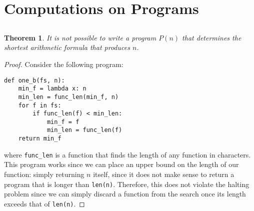 \documentclass{article}
\newtheorem{theorem}{Theorem}
\begin{document}
\section{Computations on Programs}

\subsection{}

\begin{theorem}
    It is not possible to write a program \(P(n)\) that determines the shortest arithmetic formula that produces \(n\).
\end{theorem}
\begin{proof}
    Consider the following program:
    \begin{lstlisting}
def one_b(fs, n):
    min_f = lambda x: n
    min_len = func_len(min_f, n)
    for f in fs:
        if func_len(f) < min_len:
            min_f = f
            min_len = func_len(f)
    return min_f
    \end{lstlisting}
    where \lstinline|func_len| is a function that finds the length of any function in characters.
    This program works since we can place an upper bound on the length of our function: simply returning \(n\) itself, since it does not make sense to return a program that is longer than \lstinline|len(n)|.
    Therefore, this does not violate the halting problem since we can simply discard a function from the search once its length exceeds that of \lstinline|len(n)|.
\end{proof}

\subsection{}
\end{document}

